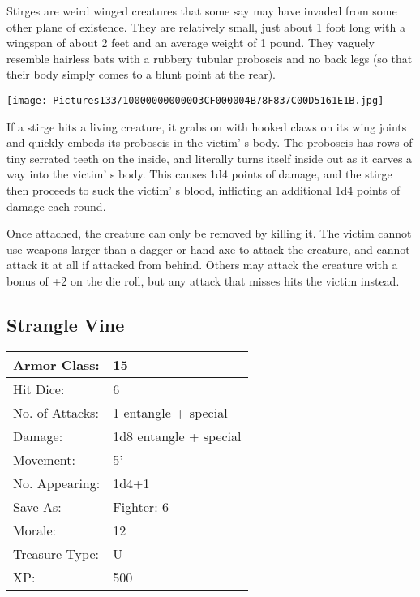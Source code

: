 \documentclass[a4paper,twoside,openany,10pt]{book}
\begin{document}
\begin{multicols}{2}
Stirges are weird winged creatures that some say may have invaded from some other plane of existence. They are relatively small, just about 1 foot long with a wingspan of about 2 feet and an average weight of 1 pound. They vaguely resemble hairless bats with a rubbery tubular proboscis and no back legs (so that their body simply comes to a blunt point at the rear).


\begin{center} \texttt{[image: Pictures133/10000000000003CF000004B78F837C00D5161E1B.jpg]} \end{center}

If a stirge hits a living creature, it grabs on with hooked claws on its wing joints and quickly embeds its proboscis in the victim' s body. The proboscis has rows of tiny serrated teeth on the inside, and literally turns itself inside out as it carves a way into the victim' s body. This causes 1d4 points of damage, and the stirge then proceeds to suck the victim' s blood, inflicting an additional 1d4 points of damage each round.

Once attached, the creature can only be removed by killing it. The victim cannot use weapons larger than a dagger or hand axe to attack the creature, and cannot attack it at all if attacked from behind. Others may attack the creature with a bonus of +2 on the die roll, but any attack that misses hits the victim instead.

\subsection*{Strangle Vine}\label{strangle-vine}

\begin{tabularx}{0.50\textwidth}{@{}lX@{}}
Armor Class: & 15 \\\hline
Hit Dice: & 6 \\\hline
No. of Attacks: & 1 entangle + special \\\hline
Damage: & 1d8 entangle + special \\\hline
Movement: & 5' \\\hline
No. Appearing: & 1d4+1 \\\hline
Save As: & Fighter: 6 \\\hline
Morale: & 12 \\\hline
Treasure Type: & U \\\hline
XP: & 500 \\\hline
\end{tabularx}\medskip


\end{multicols}
\end{document}
